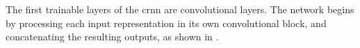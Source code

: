 
The first trainable layers of the \gls{crnn} are
convolutional layers. The network begins by processing each
input representation in its own convolutional block, and
concatenating the resulting outputs, as shown in
.

